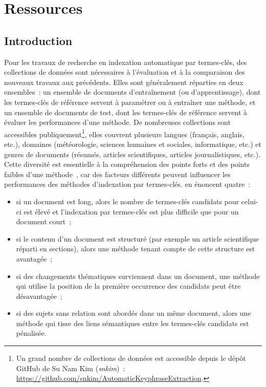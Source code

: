 \chapter{Ressources}
\label{chap:main-data_description}

  \section{Introduction}
  \label{sec:main-data_description-introduction}
    Pour les travaux de recherche en indexation automatique par termes-clés, des
    collections de données sont nécessaires à l'évaluation et à la comparaison
    des nouveaux travaux aux précédents. Elles sont généralement réparties en
    deux ensembles~: un ensemble de documents d'entraînement (ou
    d'apprentissage), dont les termes-clés de référence servent à paramétrer ou
    à entraîner une méthode, et un ensemble de documents de test, dont les
    termes-clés de référence servent à évaluer les performances d'une méthode.
    De nombreuses collections sont accessibles publiquement\footnote{Un grand
    nombre de collections de données est accessible depuis le dépôt GitHub de Su
    Nam Kim (\textit{snkim})~:
    \url{https://github.com/snkim/AutomaticKeyphraseExtraction}.}, elles
    couvrent plusieurs langues (français, anglais, etc.), domaines
    (météorologie, sciences humaines et sociales, informatique, etc.) et genres
    de documents (résumés, articles scientifiques, articles journalistiques,
    etc.). Cette diversité est essentielle à la compréhension des points forts
    et des points faibles d'une méthode~\cite{hassan2010conundrums}, car des
    facteurs différents peuvent influencer les performances des méthodes
    d'indexation par termes-clés.  en
    énoncent quatre~:
    \begin{itemize}
      \item{si un document est long, alors le nombre de termes-clés candidats
            pour celui-ci est élevé et l'indexation par termes-clés est plus
            difficile que pour un document court~;}
      \item{si le contenu d'un document est structuré (par exemple un article
            scientifique réparti en sections), alors une méthode tenant compte
            de cette structure est avantagée~;}
      \item{si des changements thématiques surviennent dans un document, une
            méthode qui utilise la position de la première occurrence des
            candidats peut être désavantagée~;}
      \item{si des sujets sans relation sont abordés dans un même document,
            alors une méthode qui tisse des liens sémantiques entre les
            termes-clés candidats est pénalisée.}
    \end{itemize}
